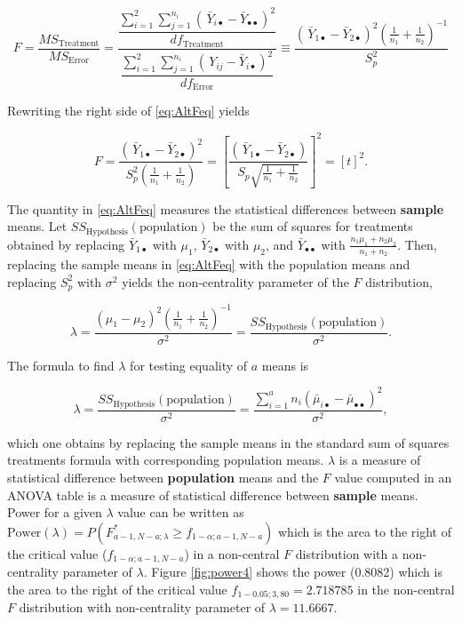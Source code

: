\documentclass[
]{article}
\begin{document}
\begin{equation}
F = \frac{MS_\text{Treatment}}{MS_\text{Error}} = \dfrac{\dfrac{\sum_{i=1}^2 \sum_{j=1}^{n_i} (\,\bar{Y}_{i\bullet} - \bar{Y}_{\bullet\bullet})^2}{df_\text{Treatment}}}{\dfrac{\sum_{i=1}^2 \sum_{j=1}^{n_i}(\, Y_{ij}- \bar{Y}_{i\bullet})^2}{ df_\text{Error}}} \equiv \dfrac{(\,\bar{Y}_{1\bullet} -\bar{Y}_{2\bullet})^2 \left( \frac{1}{n_1} + \frac{1}{n_2} \right)^{-1}}{S^2_p}
\label{eq:AltFeq}
\end{equation}

Rewriting the right side of \eqref{eq:AltFeq} yields

\begin{equation}
F = \dfrac{(\,\bar{Y}_{1\bullet} -\bar{Y}_{2\bullet})^2 }{S^2_p\left( \frac{1}{n_1} + \frac{1}{n_2} \right)} = \left[ \dfrac{(\,\bar{Y}_{1\bullet} -\bar{Y}_{2\bullet}) }{S_p \sqrt{ \frac{1}{n_1} + \frac{1}{n_2}}} \right]^2 = [t]^2.
\label{eq:tsqEQ}
\end{equation}

The quantity in \eqref{eq:AltFeq} measures the statistical differences between \textbf{sample} means. Let \(SS_\text{Hypothesis}(\text{population})\) be the sum of squares for treatments obtained by replacing \(\bar{Y}_{1\bullet}\) with \(\mu_1\), \(\bar{Y}_{2\bullet}\) with \(\mu_2\), and \(\bar{Y}_{\bullet\bullet}\) with \(\frac{n_1\mu_1+n_2\mu_2}{n_1+n_2}\). Then, replacing the sample means in \eqref{eq:AltFeq} with the population means and replacing \(S_p^2\) with \(\sigma^2\) yields the non-centrality parameter of the \(F\) distribution,

\begin{equation*}
\lambda =  \frac{ ( \mu_1 - \mu_2 )^2\left( \frac{1}{n_1} + \frac{1}{n_2} \right)^{-1} }{\sigma^2} = \frac{SS_\text{Hypothesis}(\text{population})}{\sigma^2}.
\end{equation*}

The formula to find \(\lambda\) for testing equality of \(a\) means is

\begin{equation*}
\lambda = \frac{SS_\text{Hypothesis}(\text{population})}{\sigma^2} = \frac{\sum_{i=1}^{a}n_i(\bar{\mu}_{i\bullet} - \bar{\mu}_{\bullet\bullet})^2}{\sigma^2},
\end{equation*}

which one obtains by replacing the sample means in the standard sum of squares treatments formula with corresponding population means. \(\lambda\) is a measure of statistical difference between \textbf{population} means and the \(F\) value computed in an ANOVA table is a measure of statistical difference between \textbf{sample} means. Power for a given \(\lambda\) value can be written as \(\text{Power}(\lambda) = P(F^*_{a-1, N-a; \lambda}\geq f_{1-\alpha; a-1, N-a})\) which is the area to the right of the critical value (\(f_{1-\alpha; a-1, N-a}\)) in a non-central \(F\) distribution with a non-centrality parameter of \(\lambda\). Figure \ref{fig:power4} shows the power (0.8082) which is the area to the right of the critical value \(f_{1 - 0.05; 3, 80} = 2.718785\) in the non-central \(F\) distribution with non-centrality parameter of \(\lambda = 11.6667\).
\end{document}
